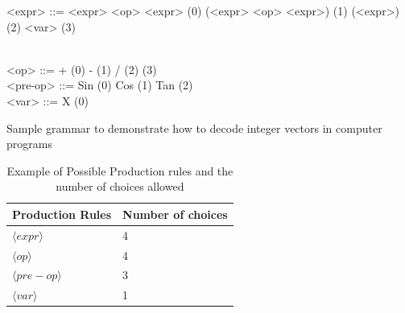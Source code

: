 \documentclass[conference]{IEEEtran}
\begin{document}
%	
%	
%	
%	


\begin{Grammar}
	\begin{grammar}
		
		
		<expr> ::=  <expr> <op> <expr> \hspace{2cm} (0) 
		\alt (<expr> <op> <expr>)  \hspace{1.75cm}  (1)  
		\alt <pre-op> (<expr>) \hspace{2.2cm}  (2)  \hspace{3.9cm} (3) \\\
		
		<op> ::=  + \hspace{4.4cm} (0)   \alt - \hspace{4.5cm}  (1)  \alt  /  \hspace{4.51cm}  (2) \alt * \hspace{4.45cm}  (3) \\
		
		<pre-op> ::= Sin \hspace{4.2cm} (0) \alt Cos
	\hspace{4.12cm} (1) \alt Tan  \hspace{4.13cm} (2) \\
		
		<var> ::= X  \hspace{4.4cm} (0)
		
		
	\end{grammar}
	
	\caption{Sample grammar to demonstrate how to decode integer vectors in computer programs}
	\label{gram:gramatica}
\end{Grammar}


\begin{table}[htb]
	\centering
	\caption{Example of Possible Production rules and the number of choices allowed}
	\label{tab:productionRules}
	\begin{tabular}{|l|l|}
		\hline
		Production Rules & Number of choices \\ \hline
		$\langle expr \rangle$                        & 4       \\ \hline
		$\langle op \rangle$                         & 4       \\ \hline
		$\langle pre-op \rangle$                         & 3       \\ \hline
		$\langle var \rangle$                          & 1       \\ \hline
	\end{tabular}
\end{table}
\end{document}

